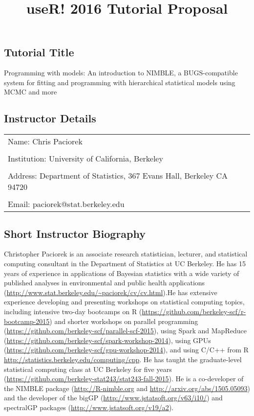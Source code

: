 \documentclass[]{article}
\title{useR! 2016 Tutorial Proposal}
\author{}
\date{}
\begin{document}
\maketitle



\subsection{Tutorial Title}\label{tutorial-title}

Programming with models: An introduction to NIMBLE, a BUGS-compatible system for fitting and programming with hierarchical statistical models using MCMC and more

\subsection{Instructor Details}\label{instructor-details}

\begin{longtable}[c]{@{}ll@{}}
\toprule
Name: Chris Paciorek &\tabularnewline
&\tabularnewline
Institution: University of California, Berkeley&\tabularnewline
&\tabularnewline
Address: Department of Statistics, 367 Evans Hall, Berkeley CA 94720 &\tabularnewline
&\tabularnewline
Email: paciorek@stat.berkeley.edu &\tabularnewline
\bottomrule
\end{longtable}

\subsection{Short Instructor
Biography}\label{short-instructor-biography}

Christopher Paciorek is an associate research statistician, lecturer, and statistical computing consultant in the Department of Statistics at UC Berkeley. He has 15 years of experience in applications of Bayesian statistics with a wide variety of published analyses in environmental and public health applications (\url{http://www.stat.berkeley.edu/~paciorek/cv/cv.html}).He has extensive experience developing and presenting workshops on statistical computing topics, including intensive two-day bootcamps on R (\url{https://github.com/berkeley-scf/r-bootcamp-2015}) and  shorter workshops on parallel programming (\url{https://github.com/berkeley-scf/parallel-scf-2015}), using Spark and MapReduce (\url{https://github.com/berkeley-scf/spark-workshop-2014}), using GPUs (\url{https://github.com/berkeley-scf/gpu-workshop-2014}), and using C/C++ from R \url{http://statistics.berkeley.edu/computing/cpp}. He has taught the graduate-level statistical computing class at UC Berkeley for five years (\url{https://github.com/berkeley-stat243/stat243-fall-2015}). He is a co-developer of the NIMBLE package (\url{http://R-nimble.org} and \url{http://arxiv.org/abs/1505.05093}) and the developer of the bigGP (\url{http://www.jstatsoft.org/v63/i10/}) and spectralGP packages (\url{http://www.jstatsoft.org/v19/a2}).  
\end{document}
